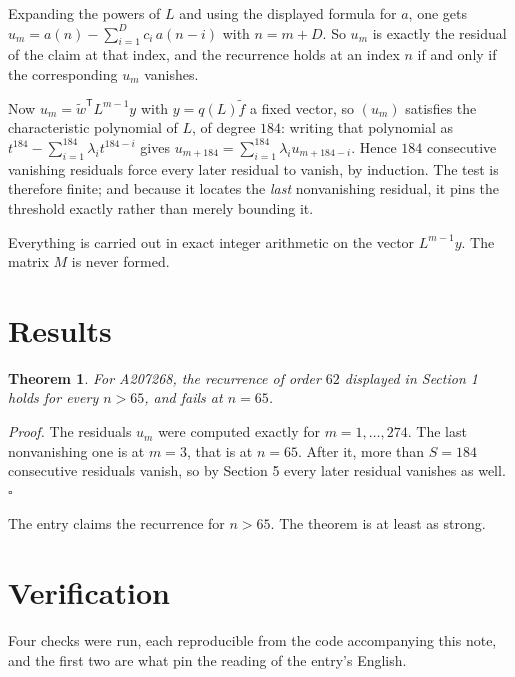 \documentclass[11pt]{article}
\newtheorem{theorem}{Theorem}
\theoremstyle{definition}
\begin{document}
Expanding the powers of $L$ and using the displayed formula for $a$, one gets $u_m = a(n) - \sum_{i=1}^{D} c_i\,a(n-i)$ with $n = m + D$. So $u_m$ is exactly the residual of the claim at that index, and the recurrence holds at an index $n$ if and only if the corresponding $u_m$ vanishes.

Now $u_m = \tilde w^{\mathsf T} L^{m-1} y$ with $y = q(L)\tilde f$ a fixed vector, so $(u_m)$ satisfies the characteristic polynomial of $L$, of degree $184$: writing that polynomial as $t^{184} - \sum_{i=1}^{184} \lambda_i t^{184-i}$ gives $u_{m+184} = \sum_{i=1}^{184} \lambda_i u_{m+184-i}$. Hence $184$ consecutive vanishing residuals force every later residual to vanish, by induction. The test is therefore finite; and because it locates the {\itshape last} nonvanishing residual, it pins the threshold exactly rather than merely bounding it.

Everything is carried out in exact integer arithmetic on the vector $L^{m-1}y$. The matrix $M$ is never formed.

\section{Results}

\begin{theorem} For A207268, the recurrence of order $62$ displayed in Section 1 holds for every $n > 65$, and fails at $n = 65$.\end{theorem}

{\itshape Proof.} The residuals $u_m$ were computed exactly for $m = 1,\dots,274$. The last nonvanishing one is at $m = 3$, that is at $n = 65$. After it, more than $S = 184$ consecutive residuals vanish, so by Section 5 every later residual vanishes as well. $\square$

The entry claims the recurrence for $n > 65$. The theorem is at least as strong.

\section{Verification}

Four checks were run, each reproducible from the code accompanying this note, and the first two are what pin the reading of the entry's English.
\end{document}

